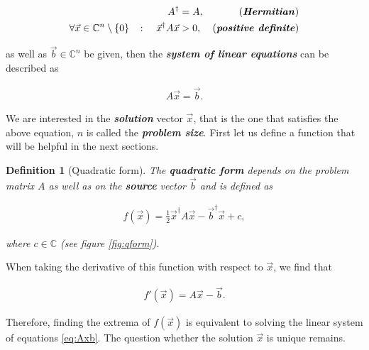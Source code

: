 \documentclass{article}
\theoremstyle{plain} %
\newtheorem{definition}{Definition}[section]
\theoremstyle{convention} %
\theoremstyle{remark} %
\def\df#1{\textbf{\textit{#1}}}
\numberwithin{equation}{section}
\begin{document}
\begin{align*}
    A^{\dagger} &= A, &\text{(\df{Hermitian})} \\
    \forall \vec{x} \in \mathbb{C}^n \setminus \{0\} \quad \colon \quad \vec{x}^{\dagger} A \vec{x} &> 0, &\text{(\df{positive definite})}
\end{align*}

as well as $\vec{b} \in \mathbb{C}^n$ be given, then the \df{system of linear equations} can be described as

\begin{align}
    A \vec{x} = \vec{b}. \label{eq:Axb}
\end{align}

We are interested in the \df{solution} vector $\vec{x}$, that is the one that satisfies the above equation, $n$ is called the \df{problem size}. First let us define a function that will be helpful in the next sections.

\begin{definition}[Quadratic form]

The \df{quadratic form} depends on the problem matrix $A$ as well as on the \df{source} vector $\vec{b}$ and is defined as

\begin{align*}
    f(\vec{x}) = \frac{1}{2} \vec{x}^{\dagger} A \vec{x} - \vec{b}^{\dagger} \vec{x} + c,
\end{align*}

where $c \in \mathbb{C}$ (see figure \ref{fig:qform}).

\end{definition}

When taking the derivative of this function with respect to $\vec{x}$, we find that

\begin{align*}
    f'(\vec{x}) = A \vec{x} - \vec{b}.
\end{align*}

Therefore, finding the extrema of $f(\vec{x})$ is equivalent to solving the linear system of equations \eqref{eq:Axb}. The question whether the solution $\vec{x}$ is unique remains.
\end{document}
